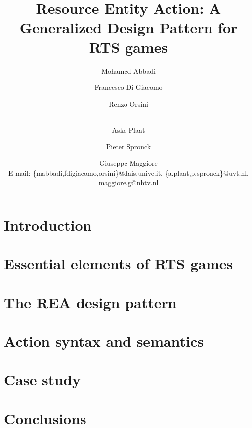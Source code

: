 \documentclass[a4paper]{llncs}
\begin{document}
\title{Resource Entity Action: A Generalized Design Pattern for RTS games}

\author{
Mohamed Abbadi\and Francesco Di Giacomo\and Renzo Orsini\and\\
Aske Plaat \and Pieter Spronck \and Giuseppe Maggiore\\
E-mail: \{mabbadi,fdigiacomo,orsini\}@dais.unive.it,
\{a.plaat,p.spronck\}@uvt.nl,
maggiore.g@nhtv.nl
}


\date{}
\maketitle

\begin{abstract}

\end{abstract}

\section{Introduction}
\label{sec:introduction}


\section{Essential elements of RTS games}
\label{sec:the_problem}


\section{The REA design pattern}
\label{sec:the_idea}


\section{Action syntax and semantics}
\label{sec:details}


\section{Case study}
\label{sec:evaluation}


%

\section{Conclusions}
\label{sec:conclusions}





\end{document}
